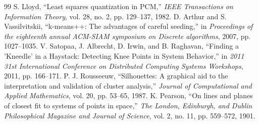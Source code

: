 \documentclass[11pt,a4paper]{article}
\begin{document}
\begin{thebibliography}{99}
 S. Lloyd, ``Least squares quantization in PCM,'' \textit{IEEE Transactions on Information Theory}, vol. 28, no. 2, pp. 129--137, 1982.
 D. Arthur and S. Vassilvitskii, ``k-means++: The advantages of careful seeding,'' in \textit{Proceedings of the eighteenth annual ACM-SIAM symposium on Discrete algorithms}, 2007, pp. 1027--1035.
 V. Satopaa, J. Albrecht, D. Irwin, and B. Raghavan, ``Finding a 'Kneedle' in a Haystack: Detecting Knee Points in System Behavior,'' in \textit{2011 31st International Conference on Distributed Computing Systems Workshops}, 2011, pp. 166--171.
 P. J. Rousseeuw, ``Silhouettes: A graphical aid to the interpretation and validation of cluster analysis,'' \textit{Journal of Computational and Applied Mathematics}, vol. 20, pp. 53--65, 1987.
 K. Pearson, ``On lines and planes of closest fit to systems of points in space,'' \textit{The London, Edinburgh, and Dublin Philosophical Magazine and Journal of Science}, vol. 2, no. 11, pp. 559--572, 1901.
\end{thebibliography}
\end{document}
